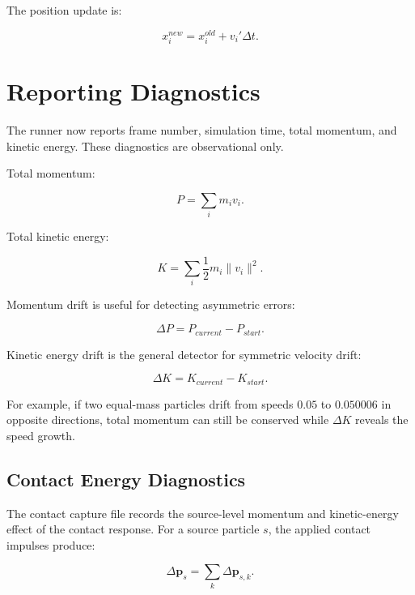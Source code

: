 The position update is:

\begin{equation}
x_i^{new} = x_i^{old} + v_i' \Delta t.
\end{equation}

\section{Reporting Diagnostics}
\label{sec:reporting-diagnostics}

The runner now reports frame number, simulation time, total momentum, and
kinetic energy.  These diagnostics are observational only.

Total momentum:

\begin{equation}
P = \sum_i m_i v_i.
\end{equation}

Total kinetic energy:

\begin{equation}
K = \sum_i \frac{1}{2}m_i \lVert v_i \rVert^2.
\end{equation}

Momentum drift is useful for detecting asymmetric errors:

\begin{equation}
\Delta P = P_{current} - P_{start}.
\end{equation}

Kinetic energy drift is the general detector for symmetric velocity drift:

\begin{equation}
\Delta K = K_{current} - K_{start}.
\end{equation}

For example, if two equal-mass particles drift from speeds $0.05$ to
$0.050006$ in opposite directions, total momentum can still be conserved while
$\Delta K$ reveals the speed growth.

\subsection{Contact Energy Diagnostics}

The contact capture file records the source-level momentum and kinetic-energy
effect of the contact response.  For a source particle $s$, the applied
contact impulses produce:

\begin{equation}
\Delta \mathbf{p}_s =
\sum_k \Delta \mathbf{p}_{s,k}.
\end{equation}

